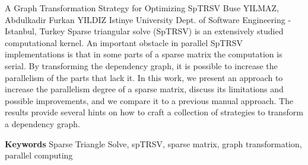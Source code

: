 
    \begin{abstract_online}{A Graph Transformation Strategy for Optimizing SpTRSV}{%
        Buse YILMAZ, Abdulkadir Furkan YILDIZ}{%
        }{%
        Istinye University Dept. of Software Engineering - Istanbul, Turkey}
    Sparse triangular solve (SpTRSV) is an extensively studied computational kernel. An important obstacle in parallel SpTRSV implementations is that in some parts of a sparse matrix the computation is serial. By transforming the dependency graph, it is possible to increase the parallelism of the parts that lack it. In this work, we present an approach to increase the parallelism degree of a sparse matrix, discuss its limitations and possible improvements, and we compare it to a previous manual approach. The results provide several hints on how to craft a collection of strategies to transform a dependency graph. 
    
        \textbf{Keywords} \newline{}Sparse Triangle Solve, spTRSV, sparse matrix, graph transformation, parallel computing
    \end{abstract_online}
    